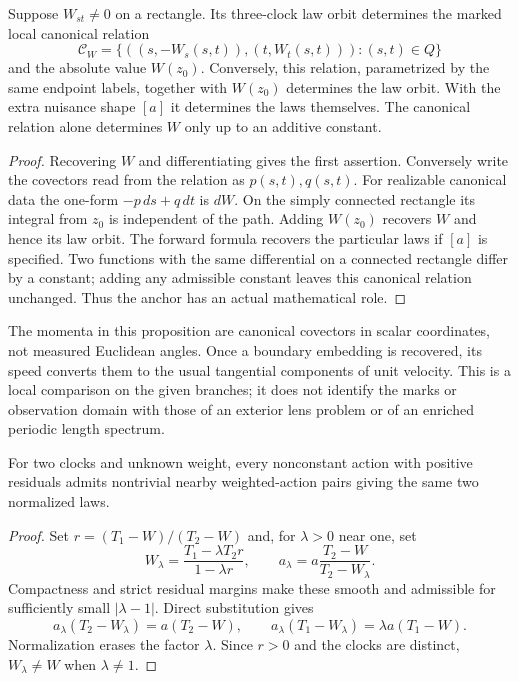 \begin{proposition}
\label{prop:v78-lens}
Suppose $W_{st}\ne0$ on a rectangle.  Its three-clock law orbit
determines the marked local canonical relation
\[
 \mathcal C_W=\{((s,-W_s(s,t)),(t,W_t(s,t))):(s,t)\in Q\}
\]
and the absolute value $W(z_0)$.  Conversely, this relation, parametrized
by the same endpoint labels, together with $W(z_0)$ determines the law
orbit.  With the extra nuisance shape $[a]$ it determines the laws
themselves.  The canonical relation alone determines $W$ only up to an
additive constant.
\end{proposition}
\begin{proof}
Recovering $W$ and differentiating gives the first assertion.  Conversely
write the covectors read from the relation as $p(s,t),q(s,t)$.  For
realizable canonical data the one-form $-p\,ds+q\,dt$ is $dW$.
On the simply connected rectangle its integral from $z_0$ is independent
of the path.  Adding $W(z_0)$ recovers $W$ and hence its law orbit.
The forward formula recovers the particular laws if $[a]$ is specified.
Two functions with the same differential on a connected rectangle differ
by a constant; adding any admissible constant leaves this canonical
relation unchanged.  Thus the anchor has an actual mathematical role.
\end{proof}

The momenta in this proposition are canonical covectors in scalar
coordinates, not measured Euclidean angles.  Once a boundary embedding
is recovered, its speed converts them to the usual tangential components
of unit velocity.  This is a local comparison on the given branches;
it does not identify the marks or observation domain with those of an
exterior lens problem or of an enriched periodic length spectrum.

\begin{proposition}
\label{prop:v78-two-clock}
For two clocks and unknown weight, every nonconstant action with
positive residuals admits nontrivial nearby weighted-action pairs giving
the same two normalized laws.
\end{proposition}
\begin{proof}
Set $r=(T_1-W)/(T_2-W)$ and, for $\lambda>0$ near one, set
\[
 W_\lambda=\frac{T_1-\lambda T_2 r}{1-\lambda r},\qquad
 a_\lambda=a\frac{T_2-W}{T_2-W_\lambda}.
\]
Compactness and strict residual margins make these smooth and admissible
for sufficiently small $|\lambda-1|$.  Direct substitution gives
\[
 a_\lambda(T_2-W_\lambda)=a(T_2-W),\qquad
 a_\lambda(T_1-W_\lambda)=\lambda a(T_1-W).
\]
Normalization erases the factor $\lambda$.  Since $r>0$ and the clocks
are distinct, $W_\lambda\ne W$ when $\lambda\ne1$.
\end{proof}

